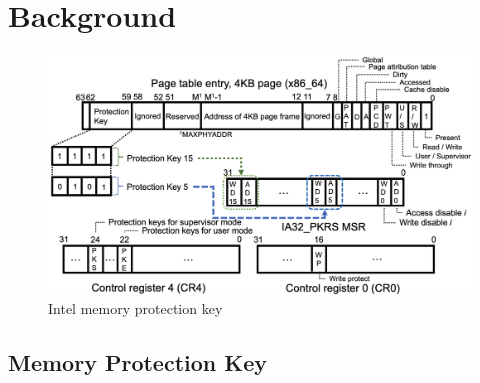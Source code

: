 \section{Background} \label{seciton:background}

\begin{figure}[t]
  \begin{center}
    \hspace{-5.5ex}
    \includegraphics[bb=0 0 1311 744, scale=.200]{./imgs/002_screenshot_2021-07-26_19.13.09.png}
  \end{center}
  \caption{
    Intel memory protection key \cite{intel-mpk}
  }
 \label{fig:mpk_overview}
\end{figure}

\subsection{Memory Protection Key}


